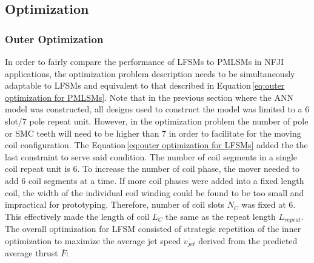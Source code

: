         
        \subsection{Optimization}                   \label{Chapter:RSM/LFSM/Optimization}
        
        
            \subsubsection{Outer Optimization}          \label{Chapter:RSM/LFSM/Optimization/Outer}
            
            
                In order to fairly compare the performance of \acsp{LFSM} to \acsp{PMLSM} in \acs{NFJI} applications, the optimization problem description needs to be simultaneously adaptable to \acsp{LFSM} and equivalent to that described in Equation\,\ref{eq:outer optimization for PMLSMs}. Note that in the previous section where the \acs{ANN} model was constructed, all designs used to construct the model was limited to a 6 slot/7 pole repeat unit. However, in the optimization problem the number of pole or \acs{SMC} teeth will need to be higher than $7$ in order to facilitate for the moving coil configuration. The Equation\,\ref{eq:outer optimization for LFSMs} added the the last constraint to serve said condition. The number of coil segments in a single coil repeat unit is $6$. To increase the number of coil phase, the mover needed to add $6$ coil segments at a time. If more coil phases were added into a fixed length coil, the width of the individual coil winding could be found to be too small and impractical for prototyping. Therefore, number of coil slots $N_C$ was fixed at $6$. This effectively made the length of coil $L_C$ the same as the repeat length $L_{repeat}$. The overall optimization for \acs{LFSM} consisted of strategic repetition of the inner optimization to maximize the average jet speed $\overline{v_{jet}}$ derived from the predicted average thrust $\overline{F}$:
                
